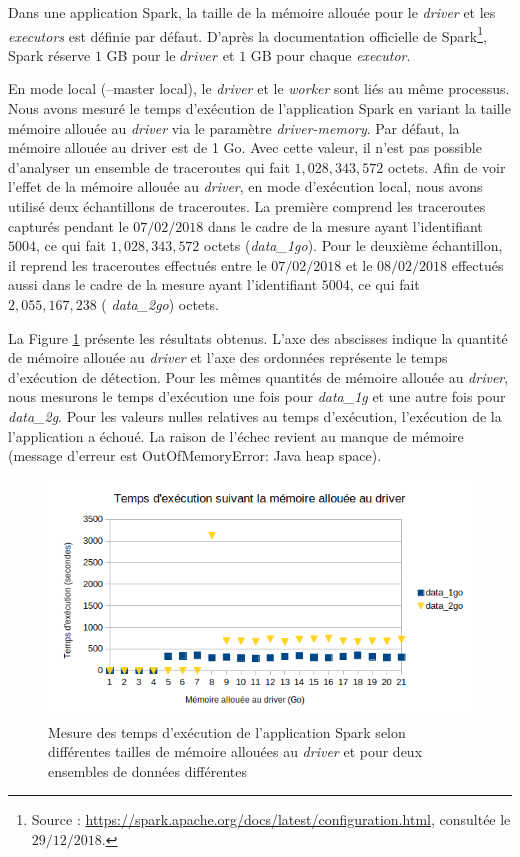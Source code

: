 Dans une application Spark, la taille de la mémoire allouée pour le \textit{driver} et les \textit{executors} est  définie par défaut. D'après la documentation officielle de Spark\footnote{Source : \url{https://spark.apache.org/docs/latest/configuration.html}, consultée le $29/12/2018$.}, Spark réserve $ 1 $ GB pour le $ driver $ et $ 1 $ GB pour chaque \textit{executor}. 

En mode local (--master local), le \textit{driver} et le \textit{worker} sont liés au même processus.  Nous avons mesuré le temps d'exécution de l'application Spark en variant la taille mémoire allouée au \textit{driver} via le paramètre \textit{driver-memory}. Par défaut, la mémoire allouée au driver est de 1 Go. Avec cette valeur, il n'est pas possible  d'analyser un ensemble de traceroutes qui fait $ 1,028,343,572 $ octets. Afin de voir l'effet de la mémoire allouée au \textit{driver}, en mode d'exécution local, nous avons utilisé deux échantillons de traceroutes. La première comprend les traceroutes capturés pendant le $ 07/02/2018 $ dans le cadre de la mesure ayant l'identifiant $ 5004 $, ce qui fait $ 1,028,343,572 $ octets (\textit{data\_1go}). Pour le deuxième échantillon, il reprend les traceroutes effectués  entre le $ 07/02/2018 $ et le $ 08/02/2018 $ effectués aussi dans le cadre de la mesure ayant l'identifiant $ 5004 $, ce qui fait $ 2,055,167,238 $ (\textit{ data\_2go}) octets.

La Figure 	\ref{fig:variantdrivermemory} présente les résultats obtenus. L'axe des abscisses indique la quantité de mémoire allouée au \textit{driver} et l'axe des ordonnées représente le temps d'exécution de détection. Pour les mêmes quantités de mémoire allouée au \textit{driver}, nous mesurons le temps d'exécution une fois pour  \textit{data\_1g}  et une autre fois pour  \textit{data\_2g}.
Pour les valeurs nulles relatives au temps d'exécution, l'exécution de la l'application a échoué. La raison de l'échec revient au manque de mémoire (message d'erreur est OutOfMemoryError: Java heap space).
\begin{figure}[H]
	\centering
	\captionsetup{justification=centering}
	\includegraphics[width=1\linewidth]{illustrations/variant_driver_memory}
	\caption{Mesure des temps d'exécution de l'application Spark selon différentes tailles de mémoire allouées au \textit{driver} et pour deux ensembles de données différentes}
	\label{fig:variantdrivermemory}
\end{figure}

